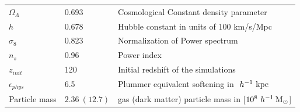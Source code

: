 \documentclass[aspectratio=43]{beamer}
\newcommand{\hMsun}{~h^{-1}\>{\rm M_\odot}}
\newcommand{\Mpc}{~h^{-1}~{\rm Mpc}}
\newcommand{\Kpc}{~h^{-1}~{\rm kpc}}
\begin{document}
\begin{frame}
\begin{itemize}
{\begin{table}
\begin{tabular}{lll}
          $\Omega_\Lambda$ & 0.693 & Cosmological Constant density parameter\\
          $h$ & 0.678  & Hubble constant in units of 100 km/s/Mpc\\
          $\sigma_8$ & 0.823 & Normalization of Power spectrum\\
          $n_s$ & 0.96  & Power index\\
          $z_{init}$ & 120 & Initial redshift of the simulations \\
          $\epsilon_{phys}$ & 6.5 & Plummer equivalent softening in $\Kpc$ \\
          Particle mass & $2.36 \ (12.7) $ & gas (dark matter) particle mass in [$10^8 \hMsun$]\\
          \hline
        \end{tabular}
      \end{table}}
\end{itemize}
\end{frame}
\end{document}
